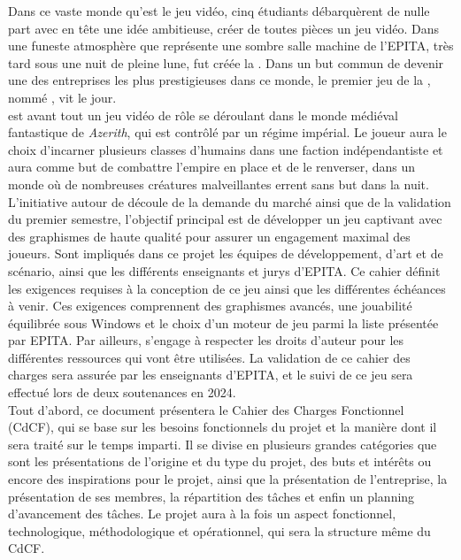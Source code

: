 
Dans ce vaste monde qu’est le jeu vidéo, cinq étudiants débarquèrent de nulle part avec en tête une idée ambitieuse, créer de toutes pièces un jeu vidéo.
Dans une funeste atmosphère que représente une sombre salle machine de l’EPITA, très tard sous une nuit de pleine lune, fut créée la \textit{\companyName}.
Dans un but commun de devenir une des entreprises les plus prestigieuses dans ce monde, le premier jeu de la \textit{\companyName}, nommé \textit{\gameName}, vit le jour.
\\

\textit{\gameName} est avant tout un jeu vidéo de rôle se déroulant dans le monde médiéval fantastique de \textit{Azerith}, qui est contrôlé par un régime impérial.
Le joueur aura le choix d’incarner plusieurs classes d’humains dans une faction indépendantiste et aura comme but de combattre l’empire en place et de le renverser, dans un monde où de nombreuses créatures malveillantes errent sans but dans la nuit.
\\

L'initiative autour de \textit{\gameName} découle de la demande du marché ainsi que de la validation du premier semestre, l’objectif principal est de développer un jeu captivant avec des graphismes de haute qualité pour assurer un engagement maximal des joueurs.
Sont impliqués dans ce projet les équipes de développement, d’art et de scénario, ainsi que les différents enseignants et jurys d’EPITA.
Ce cahier définit les exigences requises à la conception de ce jeu ainsi que les différentes échéances à venir.
Ces exigences comprennent des graphismes avancés, une jouabilité équilibrée sous Windows et le choix d’un moteur de jeu parmi la liste présentée par EPITA.
Par ailleurs, \textit{\companyName} s’engage à respecter les droits d’auteur pour les différentes ressources qui vont être utilisées.
La validation de ce cahier des charges sera assurée par les enseignants d’EPITA, et le suivi de ce jeu sera effectué lors de deux soutenances en 2024.
\\

Tout d’abord, ce document présentera le Cahier des Charges Fonctionnel (CdCF), qui se base sur les besoins fonctionnels du projet et la manière dont il sera traité sur le temps imparti.
Il se divise en plusieurs grandes catégories que sont les présentations de l’origine et du type du projet, des buts et intérêts ou encore des inspirations pour le projet, ainsi que la présentation de l’entreprise, la présentation de ses membres, la répartition des tâches et enfin un planning d’avancement des tâches.
Le projet aura à la fois un aspect fonctionnel, technologique, méthodologique et opérationnel, qui sera la structure même du CdCF.
\\

